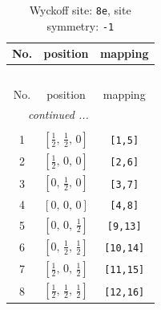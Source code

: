 \documentclass[fleqn,8pt]{jsarticle}
\begin{document}
\renewcommand{\arraystretch}{1.2}
\begin{longtable}{ccc}
\caption{Wyckoff site: {\tt 8e}, site symmetry: {\tt -1}}
 \\
 \hline \hline
No. & position & mapping \\ \hline \endfirsthead

\multicolumn{2}{l}{\tablename\ \thetable{}} \\
 \hline \hline
No. & position & mapping \\ \hline \endhead

 \hline \hline
\multicolumn{2}{r}{\footnotesize\it continued ...} \\ \endfoot

 \hline \hline
\multicolumn{2}{r}{} \\ \endlastfoot

1 & $\left[ \frac{1}{2},\, \frac{1}{2},\, 0 \right]$ & {\tt [1,5]} \\ \hline
2 & $\left[ \frac{1}{2},\, 0,\, 0 \right]$ & {\tt [2,6]} \\ \hline
3 & $\left[ 0,\, \frac{1}{2},\, 0 \right]$ & {\tt [3,7]} \\ \hline
4 & $\left[ 0,\, 0,\, 0 \right]$ & {\tt [4,8]} \\ \hline
5 & $\left[ 0,\, 0,\, \frac{1}{2} \right]$ & {\tt [9,13]} \\ \hline
6 & $\left[ 0,\, \frac{1}{2},\, \frac{1}{2} \right]$ & {\tt [10,14]} \\ \hline
7 & $\left[ \frac{1}{2},\, 0,\, \frac{1}{2} \right]$ & {\tt [11,15]} \\ \hline
8 & $\left[ \frac{1}{2},\, \frac{1}{2},\, \frac{1}{2} \right]$ & {\tt [12,16]} \\
\end{longtable}
\renewcommand{\arraystretch}{1.2}
\end{document}
